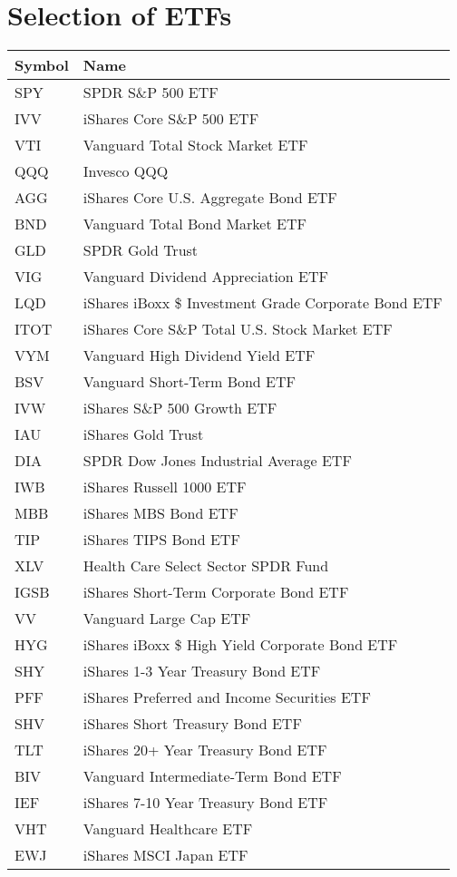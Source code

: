\chapter{Selection of ETFs}
\label{appendix:etfs}
\par
\begin{longtable}{|| m{2cm}| m{11.5cm}||}
\hline
Symbol & Name  \\ \hline \hline
SPY & SPDR S\&P 500 ETF \\ \hline \hline
IVV & iShares Core S\&P 500 ETF \\ \hline \hline
VTI & Vanguard Total Stock Market ETF \\ \hline \hline
QQQ & Invesco QQQ \\ \hline \hline
AGG & iShares Core U.S. Aggregate Bond ETF \\ \hline \hline
BND & Vanguard Total Bond Market ETF \\ \hline \hline
GLD & SPDR Gold Trust \\ \hline \hline
VIG & Vanguard Dividend Appreciation ETF \\ \hline \hline
LQD & iShares iBoxx \$ Investment Grade Corporate Bond ETF \\ \hline \hline
ITOT & iShares Core S\&P Total U.S. Stock Market ETF \\ \hline \hline
VYM & Vanguard High Dividend Yield ETF \\ \hline \hline
BSV & Vanguard Short-Term Bond ETF \\ \hline \hline
IVW & iShares S\&P 500 Growth ETF \\ \hline \hline
IAU & iShares Gold Trust \\ \hline \hline
DIA & SPDR Dow Jones Industrial Average ETF \\ \hline \hline
IWB & iShares Russell 1000 ETF \\ \hline \hline
MBB & iShares MBS Bond ETF \\ \hline \hline
TIP & iShares TIPS Bond ETF \\ \hline \hline
XLV & Health Care Select Sector SPDR Fund \\ \hline \hline
IGSB & iShares Short-Term Corporate Bond ETF \\ \hline \hline
VV & Vanguard Large Cap ETF \\ \hline \hline
HYG & iShares iBoxx \$ High Yield Corporate Bond ETF \\ \hline \hline
SHY & iShares 1-3 Year Treasury Bond ETF \\ \hline \hline
PFF & iShares Preferred and Income Securities ETF \\ \hline \hline
SHV & iShares Short Treasury Bond ETF \\ \hline \hline
TLT & iShares 20+ Year Treasury Bond ETF \\ \hline \hline
BIV & Vanguard Intermediate-Term Bond ETF \\ \hline \hline
IEF & iShares 7-10 Year Treasury Bond ETF \\ \hline \hline
VHT & Vanguard Healthcare ETF \\ \hline \hline
EWJ & iShares MSCI Japan ETF \\ \hline \hline


  
\end{longtable}